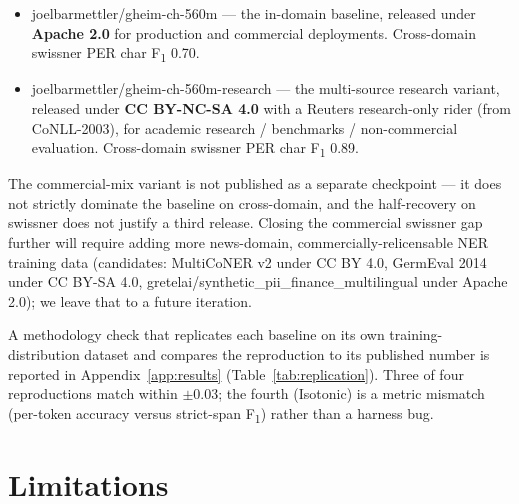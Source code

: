 \documentclass[sigconf,nonacm]{acmart}
\begin{document}
\begin{itemize}
  \item \textsf{joelbarmettler/gheim-ch-560m} — the in-domain
        baseline, released under \textbf{Apache 2.0} for production
        and commercial deployments. Cross-domain swissner PER
        char F\textsubscript{1} 0.70.
  \item \textsf{joelbarmettler/gheim-ch-560m-research} — the
        multi-source research variant, released under
        \textbf{CC BY-NC-SA 4.0} with a Reuters research-only
        rider (from CoNLL-2003), for academic research /
        benchmarks / non-commercial evaluation. Cross-domain
        swissner PER char F\textsubscript{1} 0.89.
\end{itemize}

The commercial-mix variant is not published as a separate
checkpoint --- it does not strictly dominate the baseline on
cross-domain, and the half-recovery on swissner does not justify
a third release. Closing the commercial swissner gap further
will require adding more news-domain, commercially-relicensable
NER training data (candidates: \textsf{MultiCoNER v2} under
CC BY 4.0, GermEval 2014 under CC BY-SA 4.0,
\textsf{gretelai/synthetic\_pii\_finance\_multilingual} under
Apache 2.0); we leave that to a future iteration.

A methodology check that replicates each baseline on its own
training-distribution dataset and compares the reproduction to its
published number is reported in Appendix~\ref{app:results}
(Table~\ref{tab:replication}). Three of four reproductions match
within $\pm$0.03; the fourth (Isotonic) is a metric mismatch
(per-token accuracy versus strict-span F\textsubscript{1}) rather
than a harness bug.

\section{Limitations}
\label{sec:limits}
\end{document}
